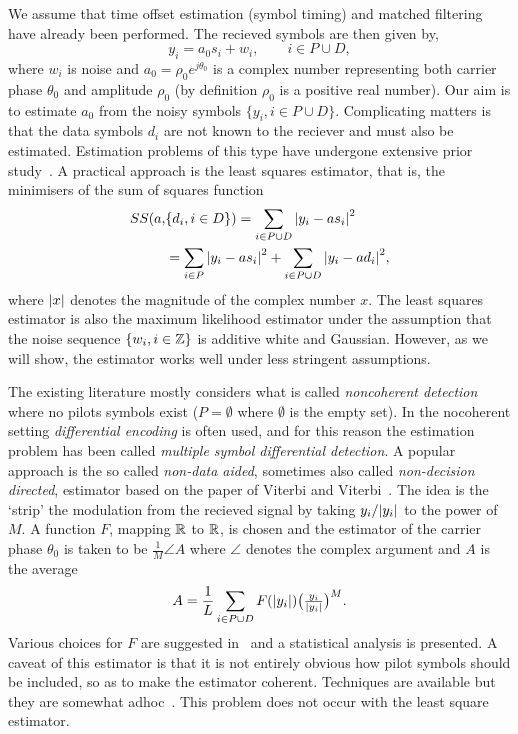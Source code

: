 \documentclass[journal]{IEEEtran}
\begin{document}
We assume that time offset estimation (symbol timing) and matched filtering have already been performed.  The recieved symbols are then given by,
\begin{equation}\label{eq:sigmod}
y_i = a_0 s_i + w_i, \qquad i \in P \cup D,
\end{equation}
where $w_i$ is noise and $a_0 = \rho_0 e^{j\theta_0}$ is a complex number representing both carrier phase $\theta_0$ and amplitude $\rho_0$ (by definition $\rho_0$ is a positive real number).  Our aim is to estimate $a_0$ from the noisy symbols $\{ y_i, i \in P \cup D \}$.  Complicating matters is that the data symbols $d_i$ are not known to the reciever and must also be estimated.  Estimation problems of this type have undergone extensive prior study~\cite{ViterbiViterbi_phase_est_1983,Cowley_ref_sym_carr_1998,Wilson1989,Makrakis1990,Liu1991,Mackenthun1994,Sweldens2001}.  A practical approach is the least squares estimator, that is, the minimisers of the sum of squares function
\begin{align*}
SS(a, &\{d_i, i \in D\}) = \sum_{i \in P \cup D} {\left\vert  y_i - a s_i  \right\vert}^2 \\
&= \sum_{i \in P} {\left\vert  y_i - a s_i  \right\vert}^2 + \sum_{i \in P \cup D} {\left\vert  y_i - a d_i  \right\vert}^2,
\end{align*}
where ${\left\vert x \right\vert}$ denotes the magnitude of the complex number $x$.  The least squares estimator is also the maximum likelihood estimator under the assumption that the noise sequence $\{w_i, i \in {\mathbb Z}\}$ is additive white and Gaussian.  However, as we will show, the estimator works well under less stringent assumptions.  %

The existing literature mostly considers what is called \emph{noncoherent detection} where no pilots symbols exist ($P = \emptyset$ where $\emptyset$ is the empty set).  In the nocoherent setting \emph{differential encoding} is often used, and for this reason the estimation problem has been called \emph{multiple symbol differential detection}.  A popular approach is the so called \emph{non-data aided}, sometimes also called \emph{non-decision directed}, estimator based on the paper of Viterbi and Viterbi~\cite{ViterbiViterbi_phase_est_1983}.  The idea is the `strip' the modulation from the recieved signal by taking $y_i / {\left\vert y_i \right\vert}$ to the power of $M$.  A function $F$, mapping ${\mathbb R}$ to ${\mathbb R}$, is chosen and the estimator of the carrier phase $\theta_0$ is taken to be $\tfrac{1}{M}\angle{A}$ where $\angle$ denotes the complex argument and $A$ is the average
\[
A = \frac{1}{L}\sum_{i \in P \cup D} F({\left\vert y_i \right\vert}) \big(\tfrac{y_i}{{\left\vert y_i \right\vert}}\big)^M.
\]
Various choices for $F$ are suggested in~\cite{ViterbiViterbi_phase_est_1983} and a statistical analysis is presented.  A caveat of this estimator is that it is not entirely obvious how pilot symbols should be included, so as to make the estimator coherent. Techniques are available but they are somewhat adhoc~\cite{Cowley_ref_sym_carr_1998}.  This problem does not occur with the least square estimator.  
\end{document}
